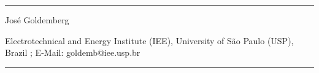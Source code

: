 \documentclass[10pt,a4paper]{article}
\begin{document}
\begin{multicols}{2}
\setlength{\parindent}{0cm}
\rule{\columnwidth \color{librelloCOLOR}}{1pt}

José Goldemberg

Electrotechnical and Energy Institute (IEE), University of São Paulo (USP), Brazil ; E-Mail: goldemb@iee.usp.br

\rule{\columnwidth \color{librelloCOLOR}}{1pt}
\vspace{18pt}
\end{multicols}

\begin{multicols}{2}


\end{multicols}
\end{document}
